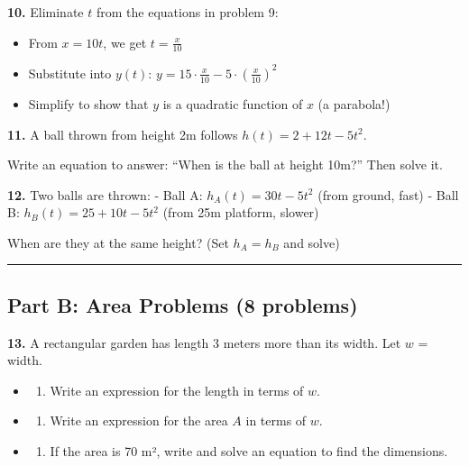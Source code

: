 \documentclass[
  11pt,
]{article}
\providecommand{\tightlist}{%
  \setlength{\itemsep}{0pt}\setlength{\parskip}{0pt}}
\begin{document}
\textbf{10.} Eliminate \(t\) from the equations in problem 9:

\begin{itemize}
\tightlist
\item
  From \(x = 10t\), we get \(t = \frac{x}{10}\)
\item
  Substitute into \(y(t)\):
  \(y = 15 \cdot \frac{x}{10} - 5 \cdot \left(\frac{x}{10}\right)^2\)
\item
  Simplify to show that \(y\) is a quadratic function of \(x\) (a
  parabola!)
\end{itemize}

\textbf{11.} A ball thrown from height 2m follows
\(h(t) = 2 + 12t - 5t^2\).

Write an equation to answer: ``When is the ball at height 10m?'' Then
solve it.

\textbf{12.} Two balls are thrown: - Ball A: \(h_A(t) = 30t - 5t^2\)
(from ground, fast) - Ball B: \(h_B(t) = 25 + 10t - 5t^2\) (from 25m
platform, slower)

When are they at the same height? (Set \(h_A = h_B\) and solve)

\begin{center}\rule{0.5\linewidth}{0.5pt}\end{center}

\hypertarget{part-b-area-problems-8-problems}{%
\subsection{Part B: Area Problems (8
problems)}\label{part-b-area-problems-8-problems}}

\textbf{13.} A rectangular garden has length 3 meters more than its
width. Let \(w\) = width.

\begin{itemize}
\item
  \begin{enumerate}
  \def\labelenumi{(\alph{enumi})}
  \tightlist
  \item
    Write an expression for the length in terms of \(w\).
  \end{enumerate}
\item
  \begin{enumerate}
  \def\labelenumi{(\alph{enumi})}
  \setcounter{enumi}{1}
  \tightlist
  \item
    Write an expression for the area \(A\) in terms of \(w\).
  \end{enumerate}
\item
  \begin{enumerate}
  \def\labelenumi{(\alph{enumi})}
  \setcounter{enumi}{2}
  \tightlist
  \item
    If the area is 70 m², write and solve an equation to find the
    dimensions.
  \end{enumerate}
\end{itemize}
\end{document}
